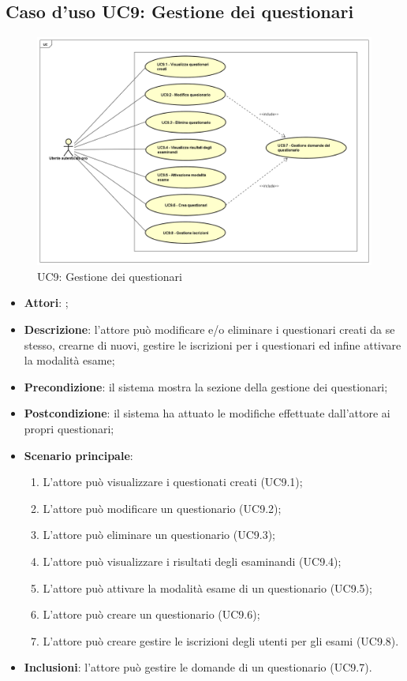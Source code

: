 \newpage
\subsection{Caso d'uso UC9: Gestione dei questionari}
\label{UC9}
\begin{figure}[ht]
	\centering
	\includegraphics[scale=0.445,keepaspectratio]{UML/UC9.png}
	\caption{UC9: Gestione dei questionari}
\end{figure}
\FloatBarrier
\begin{itemize}
	\item \textbf{Attori}: \uaupro{};
	\item \textbf{Descrizione}: l'attore può modificare e/o eliminare i questionari creati da se stesso, crearne di nuovi, gestire le iscrizioni per i questionari ed infine attivare la modalità esame; 
	\item \textbf{Precondizione}: il sistema mostra la sezione della gestione dei questionari;
	\item \textbf{Postcondizione}: il sistema ha attuato le modifiche effettuate dall'attore ai propri questionari;
	\item \textbf{Scenario principale}:
		\begin{enumerate}
			\item L'attore può visualizzare i questionati creati (UC9.1);
			\item L'attore può modificare un questionario (UC9.2);
			\item L'attore può eliminare un questionario (UC9.3);
			\item L'attore può visualizzare i risultati degli esaminandi (UC9.4);
			\item L'attore può attivare la modalità esame di un questionario (UC9.5);
			\item L'attore può creare un questionario (UC9.6);
			\item L'attore può creare gestire le iscrizioni degli utenti per gli esami (UC9.8).
		\end{enumerate}
		\item \textbf{Inclusioni}: l'attore può gestire le domande di un questionario (UC9.7).		
\end{itemize}
							

